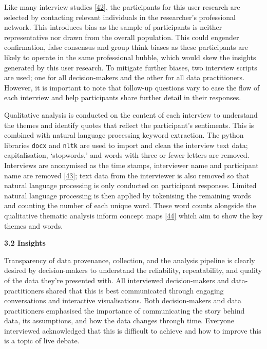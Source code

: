 \documentclass{article}
\begin{document}
Like many interview studies \protect\hyperlink{ref-futzing}{{[}42{]}},
the participants for this user research are selected by contacting
relevant individuals in the researcher's professional network. This
introduces bias as the sample of participants is neither representative
nor drawn from the overall population. This could engender confirmation,
false consensus and group think biases as these participants are likely
to operate in the same professional bubble, which would skew the
insights generated by this user research. To mitigate further biases,
two interview scripts are used; one for all decision-makers and the
other for all data practitioners. However, it is important to note that
follow-up questions vary to ease the flow of each interview and help
participants share further detail in their responses.

Qualitative analysis is conducted on the content of each interview to
understand the themes and identify quotes that reflect the participant's
sentiments. This is combined with natural language processing keyword
extraction. The python libraries \texttt{docx} and \texttt{nltk} are
used to import and clean the interview text data; capitalisation,
`stopwords,' and words with three or fewer letters are removed.
Interviews are anonymised as the time stamps, interviewer name and
participant name are removed \protect\hyperlink{ref-jono}{{[}43{]}};
text data from the interviewer is also removed so that natural language
processing is only conducted on participant responses. Limited natural
language processing is then applied by tokenising the remaining words
and counting the number of each unique word. These word counts alongside
the qualitative thematic analysis inform concept maps
\protect\hyperlink{ref-GPT}{{[}44{]}} which aim to show the key themes
and words.

\textbf{3.2 Insights}

Transparency of data provenance, collection, and the analysis pipeline
is clearly desired by decision-makers to understand the reliability,
repeatability, and quality of the data they're presented with. All
interviewed decision-makers and data-practitioners shared that this is
best communicated through engaging conversations and interactive
visualisations. Both decision-makers and data practitioners emphasised
the importance of communicating the story behind data, its assumptions,
and how the data changes through time. Everyone interviewed acknowledged
that this is difficult to achieve and how to improve this is a topic of
live debate.
\end{document}
